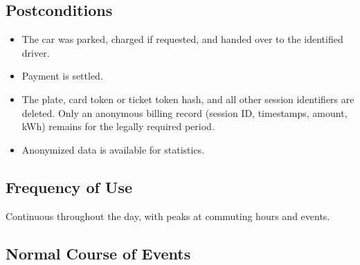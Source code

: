 \documentclass[11pt,a4paper]{article}
\begin{document}
\subsection*{Postconditions}

\begin{itemize}
    \item The car was parked, charged if requested, and handed over to the
identified driver.
\item Payment is settled.
\item The plate, card token or ticket token hash, and all other session
identifiers are deleted. Only an anonymous billing record (session ID,
timestamps, amount, kWh) remains for the legally required period.
\item Anonymized data is available for statistics.
\end{itemize}

\subsection*{Frequency of Use}

Continuous throughout the day, with peaks at commuting hours and events.

\subsection*{Normal Course of Events}
\end{document}
